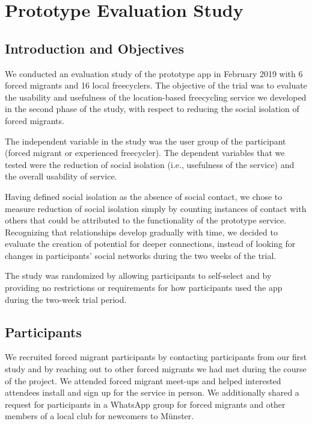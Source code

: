 \chapter{Prototype Evaluation Study}
\label{cha:evaluation}


\section{Introduction and Objectives}

We conducted an evaluation study of the prototype app in February 2019 with 6 forced migrants and 16 local freecyclers. The objective of the trial was to evaluate the usability and usefulness of the location-based freecycling service we developed in the second phase of the study, with respect to reducing the social isolation of forced migrants.

The independent variable in the study was the user group of the participant (forced migrant or experienced freecycler). The dependent variables that we tested were the reduction of social isolation (i.e., usefulness of the service) and the overall usability of service.

Having defined social isolation as the absence of social contact, we chose to measure reduction of social isolation simply by counting instances of contact with others that could be attributed to the functionality of the prototype service. Recognizing that relationships develop gradually with time, we decided to evaluate the creation of potential for deeper connections, instead of looking for changes in participants' social networks during the two weeks of the trial.

The study was randomized by allowing participants to self-select and by providing no restrictions or requirements for how participants used the app during the two-week trial period.


\section{Participants}

We recruited forced migrant participants by contacting participants from our first study and by reaching out to other forced migrants we had met during the course of the project. We attended forced migrant meet-ups and helped interested attendees install and sign up for the service in person. We additionally shared a request for participants in a WhatsApp group for forced migrants and other members of a local club for newcomers to Münster.

